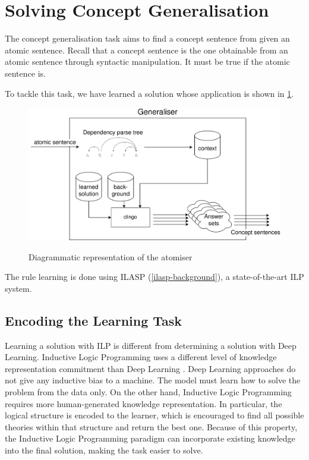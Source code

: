 \section{Solving Concept Generalisation}
\label{solving-generalisation-task}

The concept generalisation task aims to find a concept sentence from given an atomic sentence.
Recall that a concept sentence is the one obtainable from an atomic sentence through syntactic manipulation. It must be true if the atomic sentence is.

To tackle this task, we have learned a solution whose application is shown in \ref{generalisation-diagram}.

\begin{figure}[h]
\caption{Diagrammatic representation of the atomiser}
\vspace{5pt}
\centering
\includegraphics[width=\textwidth]{solving-nlp-tasks-logically/Generalisation Diagram.png}
\label{generalisation-diagram}
\end{figure}

The rule learning is done using ILASP (\ref{ilasp-background}), a state-of-the-art ILP system.

\subsection{Encoding the Learning Task}
\label{encoding-the-learning-task}

Learning a solution with ILP is different from determining a solution with Deep Learning.
Inductive Logic Programming uses a different level of knowledge representation commitment than Deep Learning \cite{notes-kr}.
Deep Learning approaches do not give any inductive bias to a machine. 
The model must learn how to solve the problem from the data only. 
On the other hand, Inductive Logic Programming requires more human-generated knowledge representation.
In particular, the logical structure is encoded to the learner, which is encouraged to find all possible theories within that structure and return the best one. 
Because of this property, the Inductive Logic Programming paradigm can incorporate existing knowledge into the final solution, making the task easier to solve.


